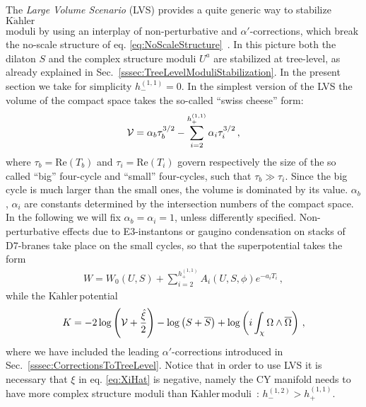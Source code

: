 \documentclass[12pt,a4paper]{book}
\newcommand{\Kahler}{\ensuremath{\text{K}\ddot{\text{a}}\text{hler}\,}}
\newcommand{\V}{{\cal{V}}}
\begin{document}
The \textit{Large Volume Scenario} (LVS) provides a quite generic way to stabilize \Kahler\\moduli by using an interplay of non-perturbative and $\alpha'$-corrections, which break the no-scale structure of eq. \eqref{eq:NoScaleStructure}~\cite{Balasubramanian:2005zx}. In this picture both the dilaton $S$ and the complex structure moduli $U^a$ are stabilized at tree-level, as already explained in Sec.~\ref{sssec:TreeLevelModuliStabilization}. In the present section we take for simplicity $h^{(1,1)}_- = 0$. In the simplest version of the LVS the volume of the compact space takes the so-called ``swiss cheese'' form:
\begin{align}
\label{eq:VolumeLVS}
\V = \alpha_b \tau_b^{3/2} - \sum_{i=2}^{h^{(1,1)}_+} \alpha_i \tau_i^{3/2}\,,
\end{align}
where $\tau_b = \text{Re}(T_b)$ and $\tau_i = \text{Re}(T_i)$ govern respectively the size of the so called ``big'' four-cycle and ``small'' four-cycles, such that $\tau_b \gg \tau_i$. Since the big cycle is much larger than the small ones, the volume is dominated by its value. $\alpha_b$, $\alpha_i$ are constants determined by the intersection numbers of the compact space. In the following we will fix $\alpha_b = \alpha_i = 1$, unless differently specified. Non-perturbative effects due to E$3$-instantons or gaugino condensation on stacks of D7-branes take place on the small cycles, so that the superpotential takes the form
\begin{align}
\label{eq:LVSSuperpotential}
W = W_0(U,S) + \sum_{i = 2}^{h^{(1,1)}_+} A_i(U,S,\phi) e^{-a_i T_i}\,,
\end{align}
while the \Kahler potential
\begin{align}
\label{eq:LVsKahlerPotential}
K = - 2 \log\left(\V + \frac{\hat{\xi}}{2}\right) - \log\left(S + \overline{S}\right) + \log\left(i \int_\chi \Omega \wedge \overline{\Omega}\right) \,,
\end{align}
where we have included the leading $\alpha'$-corrections introduced in Sec.~\ref{sssec:CorrectionsToTreeLevel}. Notice that in order to use LVS it is necessary that $\xi$ in eq. \eqref{eq:XiHat} is negative, namely the CY manifold needs to have more complex structure moduli than \Kahler moduli~\cite{Balasubramanian:2005zx}: $h^{(1,2)}_- > h^{(1,1)}_+$.\\
\end{document}
